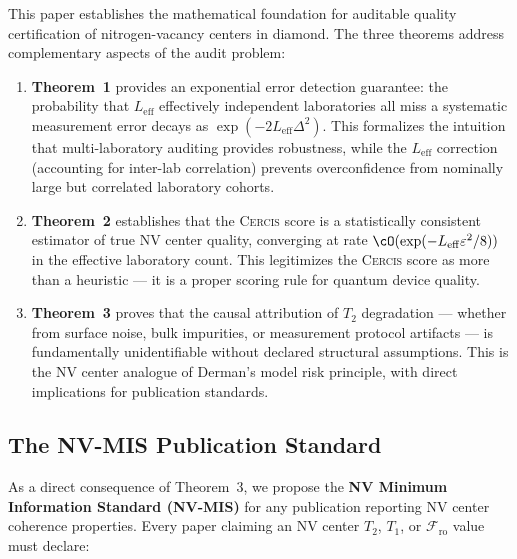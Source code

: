 \documentclass[11pt,a4paper]{article}
\newcommand{\eff}{\mathrm{eff}}
\theoremstyle{definition}
\newcommand{\Cercis}{\textsc{Cercis}}
\newcommand{\Ttwo}{T_2}
\newcommand{\Tone}{T_1}
\newcommand{\NV}{NV}
\newcommand{\FidReadout}{\mathcal{F}_{\text{ro}}}
\begin{document}
This paper establishes the mathematical foundation for auditable quality
certification of nitrogen-vacancy centers in diamond. The three theorems
address complementary aspects of the audit problem:

\begin{enumerate}[nosep]
    \item \textbf{Theorem~1} provides an exponential error detection guarantee:
    the probability that $L_{\eff}$ effectively independent laboratories
    all miss a systematic measurement error decays as $\exp(-2 L_{\eff} \Delta^2)$.
    This formalizes the intuition that multi-laboratory auditing provides
    robustness, while the $L_{\eff}$ correction (accounting for inter-lab
    correlation) prevents overconfidence from nominally large but correlated
    laboratory cohorts.

    \item \textbf{Theorem~2} establishes that the \Cercis{} score is a
    statistically consistent estimator of true \NV{} center quality,
    converging at rate $\cO(\exp(-L_{\eff} \varepsilon^2 / 8))$ in the
    effective laboratory count. This legitimizes the \Cercis{} score as
    more than a heuristic — it is a proper scoring rule for quantum
    device quality.

    \item \textbf{Theorem~3} proves that the causal attribution of $\Ttwo$
    degradation — whether from surface noise, bulk impurities, or measurement
    protocol artifacts — is fundamentally unidentifiable without declared
    structural assumptions. This is the \NV{} center analogue of Derman's
    model risk principle, with direct implications for publication standards.
\end{enumerate}

\subsection{The NV-MIS Publication Standard}

As a direct consequence of Theorem~3, we propose the \textbf{NV Minimum
Information Standard (NV-MIS)} for any publication reporting \NV{} center
coherence properties. Every paper claiming an \NV{} center $\Ttwo$, $\Tone$,
or $\FidReadout$ value must declare:
\end{document}
